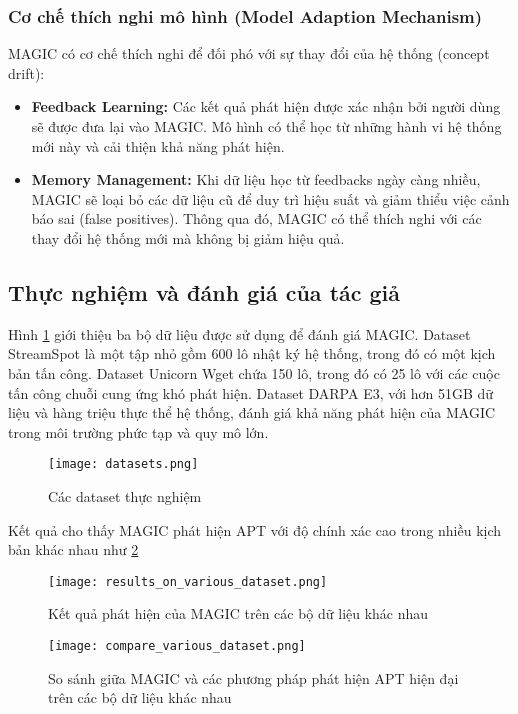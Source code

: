 \subsubsection{Cơ chế thích nghi mô hình (Model Adaption Mechanism)}
MAGIC có cơ chế thích nghi để đối phó với sự thay đổi của hệ thống (concept drift):

\begin{itemize}
    \item \textbf{Feedback Learning:} Các kết quả phát hiện được xác nhận bởi người dùng sẽ được đưa lại vào MAGIC. Mô hình có thể học từ những hành vi hệ thống mới này và cải thiện khả năng phát hiện.
    \item \textbf{Memory Management:} Khi dữ liệu học từ feedbacks ngày càng nhiều, MAGIC sẽ loại bỏ các dữ liệu cũ để duy trì hiệu suất và giảm thiểu việc cảnh báo sai (false positives). Thông qua đó, MAGIC có thể thích nghi với các thay đổi hệ thống mới mà không bị giảm hiệu quả.
\end{itemize}

\subsection{Thực nghiệm và đánh giá của tác giả}
Hình \ref{fig:datasets} giới thiệu ba bộ dữ liệu được sử dụng để đánh giá MAGIC. Dataset StreamSpot là một tập nhỏ gồm 600 lô nhật ký hệ thống, trong đó có một kịch bản tấn công. Dataset Unicorn Wget chứa 150 lô, trong đó có 25 lô với các cuộc tấn công chuỗi cung ứng khó phát hiện. Dataset DARPA E3, với hơn 51GB dữ liệu và hàng triệu thực thể hệ thống, đánh giá khả năng phát hiện của MAGIC trong môi trường phức tạp và quy mô lớn.
\begin{figure}
    \centering
    \texttt{[image: datasets.png]}
    \caption{Các dataset thực nghiệm}
    \label{fig:datasets}
\end{figure}

Kết quả cho thấy MAGIC phát hiện APT với độ chính xác cao trong nhiều kịch bản khác nhau như \ref{fig:results_on_various_dataset}

\begin{figure}
    \centering
    \texttt{[image: results\_on\_various\_dataset.png]}
    \caption{Kết quả phát hiện của MAGIC trên các bộ dữ liệu khác nhau}
    \label{fig:results_on_various_dataset}
\end{figure}

\begin{figure}
    \centering
    \texttt{[image: compare\_various\_dataset.png]}
    \caption{So sánh giữa MAGIC và các phương pháp phát hiện APT hiện đại trên các bộ dữ liệu khác nhau}
    \label{fig:compare_various_dataset}
\end{figure}

